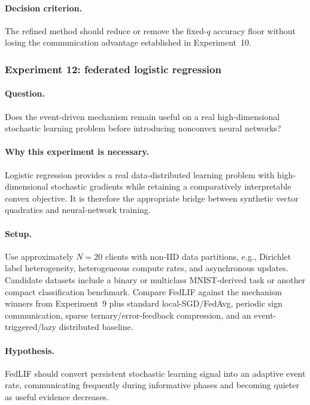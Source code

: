 \paragraph{Decision criterion.}
The refined method should reduce or remove the fixed-$q$ accuracy floor without losing the communication advantage established in Experiment~10.

\subsubsection{Experiment 12: federated logistic regression}

\paragraph{Question.}
Does the event-driven mechanism remain useful on a real high-dimensional stochastic learning problem before introducing nonconvex neural networks?

\paragraph{Why this experiment is necessary.}
Logistic regression provides a real data-distributed learning problem with high-dimensional stochastic gradients while retaining a comparatively interpretable convex objective. It is therefore the appropriate bridge between synthetic vector quadratics and neural-network training.

\paragraph{Setup.}
Use approximately $N=20$ clients with non-IID data partitions, e.g., Dirichlet label heterogeneity, heterogeneous compute rates, and asynchronous updates. Candidate datasets include a binary or multiclass MNIST-derived task or another compact classification benchmark. Compare FedLIF against the mechanism winners from Experiment~9 plus standard local-SGD/FedAvg, periodic sign communication, sparse ternary/error-feedback compression, and an event-triggered/lazy distributed baseline.

\paragraph{Hypothesis.}
FedLIF should convert persistent stochastic learning signal into an adaptive event rate, communicating frequently during informative phases and becoming quieter as useful evidence decreases.

